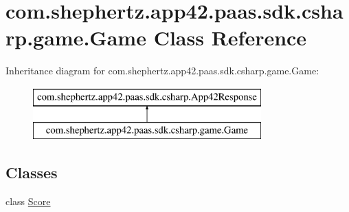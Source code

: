 \hypertarget{classcom_1_1shephertz_1_1app42_1_1paas_1_1sdk_1_1csharp_1_1game_1_1_game}{\section{com.\+shephertz.\+app42.\+paas.\+sdk.\+csharp.\+game.\+Game Class Reference}
\label{classcom_1_1shephertz_1_1app42_1_1paas_1_1sdk_1_1csharp_1_1game_1_1_game}
}
Inheritance diagram for com.\+shephertz.\+app42.\+paas.\+sdk.\+csharp.\+game.\+Game\+:\begin{figure}[H]
\begin{center}
\leavevmode
\includegraphics[height=2.000000cm]{classcom_1_1shephertz_1_1app42_1_1paas_1_1sdk_1_1csharp_1_1game_1_1_game}
\end{center}
\end{figure}
\subsection*{Classes}
\begin{DoxyCompactItemize}
\item 
class \hyperlink{classcom_1_1shephertz_1_1app42_1_1paas_1_1sdk_1_1csharp_1_1game_1_1_game_1_1_score}{Score}
\end{DoxyCompactItemize}
